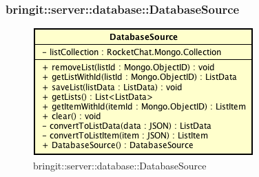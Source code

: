 \subsubsection{bringit::server::database::DatabaseSource}

\label{bringit::server::database::DatabaseSource}
\begin{figure}[H]
	\centering
	\includegraphics[scale=0.5]{Sezioni/SottosezioniST/img/app/DatabaseSource.png}
	\caption{bringit::server::database::DatabaseSource}
\end{figure}

